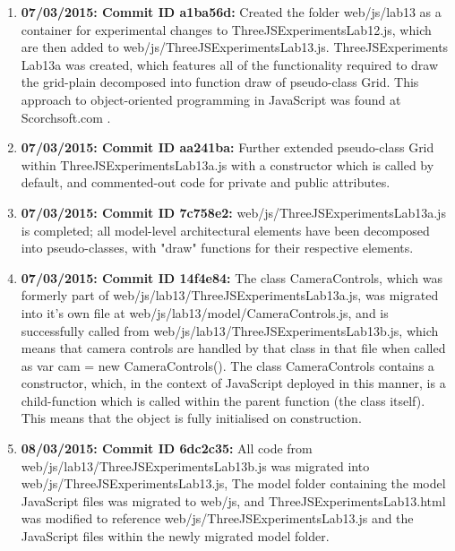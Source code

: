 \begin{enumerate}
\item \textbf{07/03/2015: Commit ID a1ba56d:} Created the folder web/js/lab13 as a container for experimental changes to ThreeJSExperiments\textunderscore Lab12.js, which are then added to web/js/ThreeJSExperiments\textunderscore Lab13.js. ThreeJSExperiments \textunderscore Lab13a was created, which features all of the functionality required to draw the grid-plain decomposed into function draw of pseudo-class Grid. This approach to object-oriented programming in JavaScript was found at Scorchsoft.com \cite{ScorchSoftJavaScriptObjectOrientation}.

\item \textbf{07/03/2015: Commit ID aa241ba:} Further extended pseudo-class Grid within ThreeJSExperiments\textunderscore Lab13a.js with a constructor which is called by default, and commented-out code for private and public attributes.

\item \textbf{07/03/2015: Commit ID 7c758e2:} web/js/ThreeJSExperiments\textunderscore Lab13a.js is completed; all model-level architectural elements have been decomposed into pseudo-classes, with "draw" functions for their respective elements.

\item \textbf{07/03/2015: Commit ID 14f4e84:} The class CameraControls, which was formerly part of web/js/lab13/ThreeJSExperiments\textunderscore Lab13a.js, was migrated into it's own file at web/js/lab13/model/CameraControls.js, and is successfully called from web/js/lab13/ThreeJSExperiments\textunderscore Lab13b.js, which means that camera controls are handled by that class in that file when called as \newline var cam = new CameraControls(). The class CameraControls contains a constructor, which, in the context of JavaScript deployed in this manner, is a child-function which is called within the parent function (the class itself). This means that the object is fully initialised on construction.

\item \textbf{08/03/2015: Commit ID 6dc2c35:} All code from web/js/lab13/ThreeJSExperiments\textunderscore Lab13b.js was migrated into web/js/ThreeJSExperiments\textunderscore Lab13.js, The model folder containing the model JavaScript files was migrated to web/js, and ThreeJSExperiments\textunderscore Lab13.html was modified to reference web/js/ThreeJSExperiments\textunderscore Lab13.js and the JavaScript files within the newly migrated model folder.

\end{enumerate}


